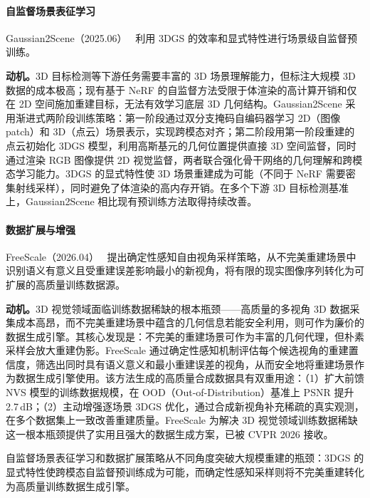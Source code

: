 \paragraph{自监督场景表征学习}

Gaussian2Scene（2025.06）~\cite{2506_08777} 利用 3DGS 的效率和显式特性进行场景级自监督预训练。

\textbf{动机。}3D 目标检测等下游任务需要丰富的 3D 场景理解能力，但标注大规模 3D 数据的成本极高；现有基于 NeRF 的自监督方法受限于体渲染的高计算开销和仅在 2D 空间施加重建目标，无法有效学习底层 3D 几何结构。Gaussian2Scene 采用渐进式两阶段训练策略：第一阶段通过双分支掩码自编码器学习 2D（图像 patch）和 3D（点云）场景表示，实现跨模态对齐；第二阶段用第一阶段重建的点云初始化 3DGS 模型，利用高斯基元的几何位置提供直接 3D 空间监督，同时通过渲染 RGB 图像提供 2D 视觉监督，两者联合强化骨干网络的几何理解和跨模态学习能力。3DGS 的显式特性使 3D 场景重建成为可能（不同于 NeRF 需要密集射线采样），同时避免了体渲染的高内存开销。在多个下游 3D 目标检测基准上，Gaussian2Scene 相比现有预训练方法取得持续改善。

\paragraph{数据扩展与增强}

FreeScale（2026.04）~\cite{2604_10512} 提出确定性感知自由视角采样策略，从不完美重建场景中识别语义有意义且受重建误差影响最小的新视角，将有限的现实图像序列转化为可扩展的高质量训练数据源。

\textbf{动机。}3D 视觉领域面临训练数据稀缺的根本瓶颈——高质量的多视角 3D 数据采集成本高昂，而不完美重建场景中蕴含的几何信息若能安全利用，则可作为廉价的数据生成引擎。其核心发现是：不完美的重建场景可作为丰富的几何代理，但朴素采样会放大重建伪影。FreeScale 通过确定性感知机制评估每个候选视角的重建置信度，筛选出同时具有语义意义和最小重建误差的视角，从而安全地将重建场景作为数据生成引擎使用。该方法生成的高质量合成数据具有双重用途：（1）扩大前馈 NVS 模型的训练数据规模，在 OOD（Out-of-Distribution）基准上 PSNR 提升 2.7\,dB；（2）主动增强逐场景 3DGS 优化，通过合成新视角补充稀疏的真实观测，在多个数据集上一致改善重建质量。FreeScale 为解决 3D 视觉领域训练数据稀缺这一根本瓶颈提供了实用且强大的数据生成方案，已被 CVPR 2026 接收。

\begin{takeaway}
自监督场景表征学习和数据扩展策略从不同角度突破大规模重建的瓶颈：3DGS 的显式特性使跨模态自监督预训练成为可能，而确定性感知采样则将不完美重建转化为高质量训练数据生成引擎。
\end{takeaway}

